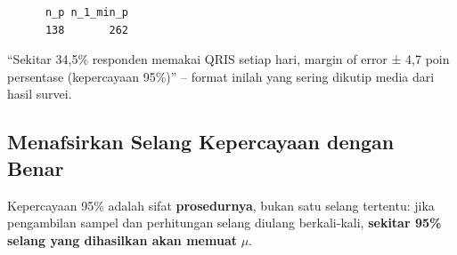 \documentclass[
  indonesian,
  letterpaper,
]{book}
\begin{document}
\begin{verbatim}
      n_p n_1_min_p 
      138       262 
\end{verbatim}

``Sekitar 34,5\% responden memakai QRIS setiap hari, margin of error ±
4,7 poin persentase (kepercayaan 95\%)'' -- format inilah yang sering
dikutip media dari hasil survei.

\subsection{Menafsirkan Selang Kepercayaan dengan
Benar}\label{menafsirkan-selang-kepercayaan-dengan-benar}

Kepercayaan 95\% adalah sifat \textbf{prosedurnya}, bukan satu selang
tertentu: jika pengambilan sampel dan perhitungan selang diulang
berkali-kali, \textbf{sekitar 95\% selang yang dihasilkan akan memuat}
\(\mu\).
\end{document}
